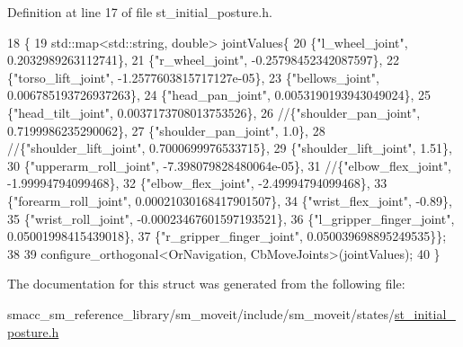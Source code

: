 Definition at line 17 of file st\+\_\+initial\+\_\+posture.\+h.


\begin{DoxyCode}
18     \{
19         std::map<std::string, double> jointValues\{
20             \{\textcolor{stringliteral}{"l\_wheel\_joint"}, 0.2032989263112741\},
21             \{\textcolor{stringliteral}{"r\_wheel\_joint"}, -0.25798452342087597\},
22             \{\textcolor{stringliteral}{"torso\_lift\_joint"}, -1.2577603815717127e-05\},
23             \{\textcolor{stringliteral}{"bellows\_joint"}, 0.006785193726937263\},
24             \{\textcolor{stringliteral}{"head\_pan\_joint"}, 0.0053190193943049024\},
25             \{\textcolor{stringliteral}{"head\_tilt\_joint"}, 0.0037173708013753526\},
26             \textcolor{comment}{//\{"shoulder\_pan\_joint", 0.7199986235290062\},}
27             \{\textcolor{stringliteral}{"shoulder\_pan\_joint"}, 1.0\},
28             \textcolor{comment}{//\{"shoulder\_lift\_joint", 0.7000699976533715\},}
29             \{\textcolor{stringliteral}{"shoulder\_lift\_joint"}, 1.51\},
30             \{\textcolor{stringliteral}{"upperarm\_roll\_joint"}, -7.398079828480064e-05\},
31             \textcolor{comment}{//\{"elbow\_flex\_joint", -1.99994794099468\},}
32             \{\textcolor{stringliteral}{"elbow\_flex\_joint"}, -2.49994794099468\},
33             \{\textcolor{stringliteral}{"forearm\_roll\_joint"}, 0.00021030168417901507\},
34             \{\textcolor{stringliteral}{"wrist\_flex\_joint"}, -0.89\},
35             \{\textcolor{stringliteral}{"wrist\_roll\_joint"}, -0.00023467601597193521\},
36             \{\textcolor{stringliteral}{"l\_gripper\_finger\_joint"}, 0.05001998415439018\},
37             \{\textcolor{stringliteral}{"r\_gripper\_finger\_joint"}, 0.050039698895249535\}\};
38 
39         configure\_orthogonal<OrNavigation, CbMoveJoints>(jointValues);
40     \}
\end{DoxyCode}


The documentation for this struct was generated from the following file\+:\begin{DoxyCompactItemize}
\item 
smacc\+\_\+sm\+\_\+reference\+\_\+library/sm\+\_\+moveit/include/sm\+\_\+moveit/states/\hyperlink{st__initial__posture_8h}{st\+\_\+initial\+\_\+posture.\+h}\end{DoxyCompactItemize}

